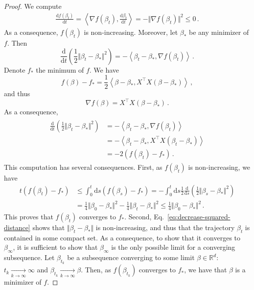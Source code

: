 \documentclass[11pt,reqno]{article}
\newcommand{\diff}{\mathrm{d}}
\newcommand{\R}{\mathbb{R}}
\renewcommand{\leq}{\leqslant}
\numberwithin{equation}{section}
\theoremstyle{plain}
\theoremstyle{definition}
\theoremstyle{remark}
\begin{document}
\begin{proof}
	We compute 
	\begin{align*}
		\frac{\diff f(\beta_t)}{\diff t} = \left\langle \nabla f(\beta_t), \frac{\diff \beta_t}{\diff t}\right\rangle = - \Vert \nabla f(\beta_t) \Vert^2 \leq 0 \, .
	\end{align*}
	As a consequence, $f(\beta_t)$ is non-increasing. Moreover, let $\beta_*$ be any minimizer of $f$. Then 
	\begin{equation*}
		\frac{\diff }{\diff t} \left(\frac{1}{2 } \Vert \beta_t - \beta_* \Vert^2\right) = - \left\langle \beta_t - \beta_*, \nabla f(\beta_t)\right\rangle \, . 
	\end{equation*}
	Denote $f_*$ the minimum of $f$. We have 
	\begin{equation*}
		f(\beta) - f_* = \frac{1}{2} \left\langle \beta - \beta_*, X^\top X (\beta - \beta_*)\right\rangle \, ,
	\end{equation*}
	and thus 
	\begin{equation*}
		\nabla f(\beta) = X^\top X (\beta - \beta_*) \, .
	\end{equation*}
	As a consequence, 
	\begin{align}
		\label{eq:decrease-squared-distance}
		\begin{split}
		\frac{\diff }{\diff t} \left(\frac{1}{2 } \Vert \beta_t - \beta_* \Vert^2\right) &= - \left\langle \beta_t - \beta_*, \nabla f(\beta_t)\right\rangle  \\
		&= - \left\langle \beta_t - \beta_*, X^\top X(\beta_t - \beta_*)\right\rangle \\
		&= -2 \left(f(\beta_t) - f_*\right)\, . 
		\end{split}
	\end{align}
	This computation has several consequences. First, as $f(\beta_t)$ is non-increasing, we have 
	\begin{align*}
		t \left(f(\beta_t) - f_*\right) &\leq \int_{0}^{t} \diff s \left(f(\beta_s) - f_*\right) = - \int_{0}^{t} \diff s \frac{1}{2} \frac{\diff }{\diff s} \left(\frac{1}{2 } \Vert \beta_s - \beta_* \Vert^2\right)\\ 
		&= \frac{1}{4} \Vert \beta_0 - \beta_* \Vert^2 - \frac{1}{4} \Vert \beta_t - \beta_* \Vert^2 \leq \frac{1}{4} \Vert \beta_0 - \beta_* \Vert^2 \, .
	\end{align*}
	This proves that $f(\beta_t)$ converges to $f_*$. Second, Eq.~\eqref{eq:decrease-squared-distance} shows that $\Vert \beta_t - \beta_* \Vert$ is non-increasing, and thus that the trajectory $\beta_t$ is contained in some compact set. As a consequence, to show that it converges to $\beta_\infty$, it is sufficient to show that $\beta_\infty$ is the only possible limit for a converging subsequence. Let $\beta_{t_k}$ be a subsequence converging to some limit $\beta \in \R^d$: $t_k \xrightarrow[k \to \infty]{} \infty$ and $\beta_{t_k} \xrightarrow[k \to \infty]{} \beta$. Then, as $f(\beta_{t_k})$ converges to $f_*$, we have that $\beta$ is a minimizer of $f$. 


\end{proof}
\end{document}
